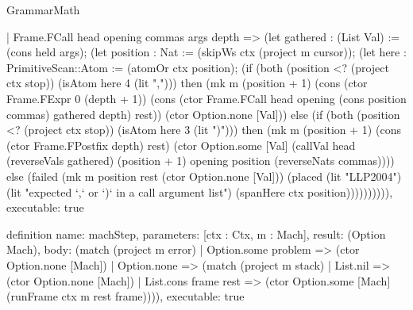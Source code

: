 \begin{lexlean}{GrammarMath}
\begin{semanticmodule}
{{{{    | Frame.FCall head opening commas args depth => (let gathered : (List Val) := (cons held args); (let position : Nat := (skipWs ctx (project m cursor)); (let here : PrimitiveScan::Atom := (atomOr ctx position); (if (both (position <? (project ctx stop)) (isAtom here 4 (lit ","))) then (mk m (position + 1) (cons (ctor Frame.FExpr 0 (depth + 1)) (cons (ctor Frame.FCall head opening (cons position commas) gathered depth) rest)) (ctor Option.none [Val])) else (if (both (position <? (project ctx stop)) (isAtom here 3 (lit ")"))) then (mk m (position + 1) (cons (ctor Frame.FPostfix depth) rest) (ctor Option.some [Val] (callVal head (reverseVals gathered) (position + 1) opening position (reverseNats commas)))) else (failed (mk m position rest (ctor Option.none [Val])) (placed (lit "LLP2004") (lit "expected `,` or `)` in a call argument list") (spanHere ctx position)))))))))),
  executable: true
}

definition{
  name: machStep,
  parameters: [ctx : Ctx, m : Mach],
  result: (Option Mach),
  body: (match (project m error)
    | Option.some problem => (ctor Option.none [Mach])
    | Option.none => (match (project m stack)
      | List.nil => (ctor Option.none [Mach])
      | List.cons frame rest => (ctor Option.some [Mach] (runFrame ctx m rest frame)))),
  executable: true
}

}}}
\end{semanticmodule}
\end{lexlean}
